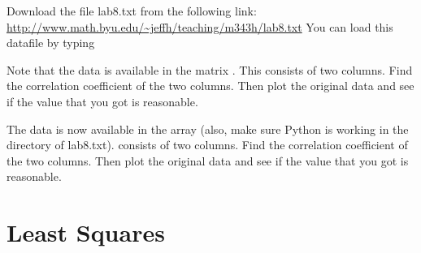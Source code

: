 \begin{problem}
Download the file lab8.txt from the following link:
\url{http://www.math.byu.edu/~jeffh/teaching/m343h/lab8.txt}
You can load this datafile by typing
\begin{matlab}
Note that the data is available in the matrix .  This consists of two columns.  Find the correlation coefficient of the two columns.  Then plot the original data and see if the value that you got is reasonable.
\end{matlab}
\begin{python}
The data is now available in the array  (also, make sure Python is working in the directory of lab8.txt).   consists of two columns.  Find the correlation coefficient of the two columns.  Then plot the original data and see if the value that you got is reasonable.
\end{python}
\end{problem}

\section*{Least Squares}

